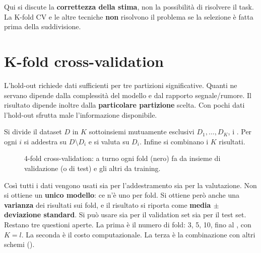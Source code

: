 \begin{attenzione}
Qui si discute la \textbf{correttezza della stima}, non la possibilità di risolvere il task. La K-fold CV e le
altre tecniche \textbf{non} risolvono il problema se la selezione è fatta prima della suddivisione.
\end{attenzione}

\section{K-fold cross-validation}
\label{sec:kfold}

L'hold-out richiede dati sufficienti per tre partizioni significative. Quanti ne servano dipende dalla
complessità del modello e dal rapporto segnale/rumore. Il risultato dipende inoltre dalla \textbf{particolare
partizione} scelta. Con pochi dati l'hold-out sfrutta male l'informazione disponibile.

\begin{definizione}
Si divide il dataset $D$ in $K$ sottoinsiemi mutuamente esclusivi $D_1,\dots,D_K$, i . Per ogni
$i$ si addestra su $D\setminus D_i$ e si valuta su $D_i$. Infine si combinano i $K$ risultati.
\end{definizione}

\begin{figure}[ht]
\centering
{}
\caption{4-fold cross-validation: a turno ogni fold (nero) fa da insieme di validazione (o di test) e gli altri
da training.}
\label{fig:kfold}
\end{figure}

Così tutti i dati vengono usati sia per l'addestramento sia per la valutazione. Non si ottiene un \textbf{unico
modello}: ce n'è uno per fold. Si ottiene però anche una \textbf{varianza} dei risultati sui fold, e il risultato
si riporta come \textbf{media $\pm$ deviazione standard}. Si può usare sia per il validation set sia per il test
set. Restano tre questioni aperte. La prima è il numero di fold: 3, 5, 10, fino al , con
$K=l$. La seconda è il costo computazionale. La terza è la combinazione con altri schemi
().

